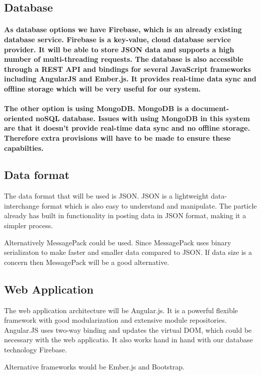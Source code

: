 \documentclass[paper=a4, fontsize=11pt]{scrartcl} %
\begin{document}
	\subsection{Database}
	\paragraph{As database options we have Firebase, which is an already existing database service. Firebase is a key-value, cloud database service provider. It will be
	able to store JSON data and supports a high number of multi-threading requests. The database is also accessible through a REST API and 
	bindings for several JavaScript frameworks including AngularJS and Ember.js. It provides real-time data sync and offline storage which will be
	very useful for our system.}
	\paragraph{The other option is using MongoDB. MongoDB is a document-oriented noSQL database. Issues with using MongoDB in this system are that it
	doesn't provide real-time data sync and no offline storage. Therefore extra provisions will have to be made to ensure these capabilties.}
	\subsection{Data format}
	The data format that will be used is JSON. JSON is a lightweight data-interchange format which is also easy to understand and
	manipulate. The particle already has built in functionality in posting data in JSON format, making it a simpler process.
	
	Alternatively MessagePack could be used. Since MessagePack uses binary serializaton to make faster and smaller data compared to JSON.
	If data size is a concern then MessagePack will be a good alternative.
	\subsection{Web Application}
	The web application architecture will be Angular.js. It is a powerful flexible framework with good modularization and extensive module
	repositories. Angular.JS uses two-way binding and updates the virtual DOM, which could be necessary with the web applicatio. It also works
	hand in hand with our database technology Firebase.
	
	Alternative frameworks would be Ember.js and Bootstrap.
\end{document}
